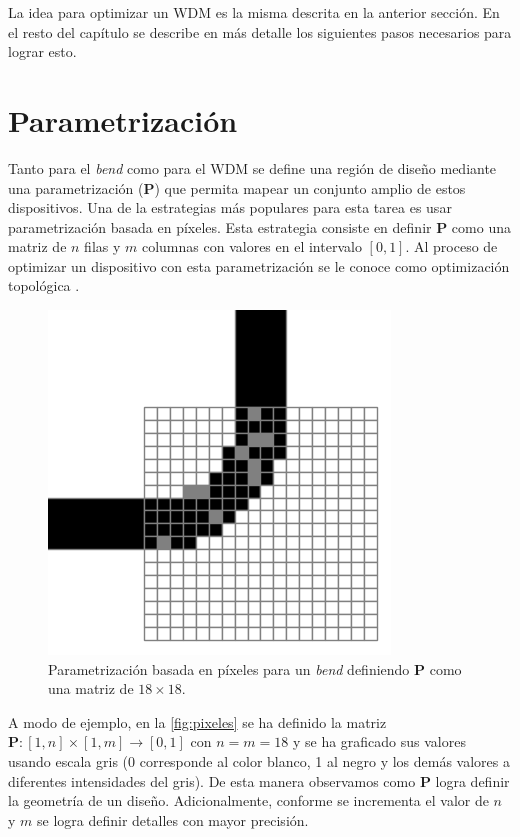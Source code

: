 La idea para optimizar un WDM es la misma descrita en la anterior sección. 
En el resto del capítulo se describe en más detalle los siguientes pasos necesarios para lograr esto.

\section{Parametrización}\label{sec:parametrization}

Tanto para el \emph{bend} como para el WDM se define una región de diseño
mediante una parametrización ($\boldsymbol{P}$) que permita mapear un conjunto amplio de estos dispositivos.
Una de la estrategias más populares para esta tarea es usar parametrización
basada en píxeles. Esta estrategia consiste en definir $\boldsymbol{P}$ como una matriz 
de $n$ filas y $m$ columnas con valores en el intervalo $[0, 1]$.
Al proceso de optimizar un dispositivo con esta parametrización se le conoce como optimización
topológica \citep{Molesky2018}.

\begin{figure}[h]
  \centering
  \includegraphics[scale=0.7]{image/theory/parametrization-pixeles.png}
  \caption{Parametrización basada en píxeles para un \emph{bend} definiendo $\boldsymbol{P}$ como una matriz de $18 \times 18$.}
  \label{fig:pixeles}
\end{figure}

A modo de ejemplo, en la \autoref{fig:pixeles} se ha definido la matriz $\boldsymbol{P}: [1, n] \times [1, m]
\to [0, 1]$ con $n = m = 18$ y se ha graficado sus valores
usando escala gris (0 corresponde al color blanco, 1 al negro y los demás valores a diferentes
intensidades del gris). De esta manera observamos como $\boldsymbol{P}$ logra definir la geometría de un
diseño.
Adicionalmente, conforme se incrementa el valor de $n$ y $m$ se logra definir detalles con mayor precisión.


